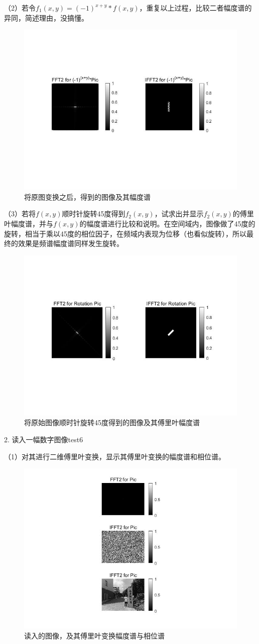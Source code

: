\documentclass[UTF8]{article} %
\begin{document}
	（2）若令$f_{1}(x,y)=(-1)^{x+y}* f(x,y)$，重复以上过程，比较二者幅度谱的异同，简述理由，没搞懂。
	\begin{figure}[H]
		\centering
		\includegraphics[width=0.7\linewidth]{2-3}
		\caption{将原图变换之后，得到的图像及其幅度谱}
		\label{fig:2-3}
	\end{figure}
	
	（3）若将$f(x,y)$顺时针旋转45度得到$f_{2}(x,y)$，试求出并显示$f_{2}(x,y)$的傅里叶幅度谱，并与$f(x,y)$的幅度谱进行比较和说明。在空间域内，图像做了45度的旋转，相当于乘以45度的相位因子，在频域内表现为位移（也看似旋转），所以最终的效果是频谱幅度谱同样发生旋转。
	\begin{figure}[H]
		\centering
		\includegraphics[width=0.7\linewidth]{2-4}
		\caption{将原始图像顺时针旋转45度得到的图像及其傅里叶幅度谱}
		\label{fig:2-4}
	\end{figure}
	
	
	2. 读入一幅数字图像test6
	
	（1）对其进行二维傅里叶变换，显示其傅里叶变换的幅度谱和相位谱。
	\begin{figure}[H]
		\centering
		\includegraphics[width=0.7\linewidth]{2-5}
		\caption{读入的图像，及其傅里叶变换幅度谱与相位谱}
		\label{fig:2-5}
	\end{figure}
	
\end{document}
